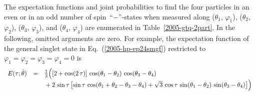 \documentclass[rmp,amsfonts,showpacs,showkeys,preprint]{revtex4}
\begin{document}
The expectation functions and joint probabilities to find the four particles
in an even or in an odd number of
spin~``$-$''-states when measured along
($\theta_1$, $\varphi_1 $),
($\theta_2$, $\varphi_2 $),
($\theta_3$, $\varphi_3 $),  and
($\theta_4$, $\varphi_4 $)
are enumerated in Table~\ref{2005-gtq-2part}.
%
%
In the following, omitted arguments are zero.
For example, the expectation function of the general singlet state
in Eq.~(\ref{2005-hp-ep24smgf})
restricted to
$\varphi_1=\varphi_2=\varphi_3=\varphi_4=0$
is
\begin{equation}
\begin{array}{lll}
E(\tau  ;{\hat \theta} )  &=&
\frac{1}{3}\Bigl(
\left[ 2 + \cos (2\,\tau  ) \right] \,\cos (\theta_1  - \theta_2 )\,\cos (\theta_3  - \theta_4 )\\
&&{}+ 2\,\sin \tau
         \left[\sin \tau  \,\cos (\theta_1  + \theta_2  - \theta_3  - \theta_4 ) +
       {\sqrt{3}}\,\cos \tau  \,\sin (\theta_1  - \theta_2 )\,\sin (\theta_3  - \theta_4 ) \right]
\Bigr)
\end{array}
  \label{2005-gtq-Expmgf}
\end{equation}
\end{document}
